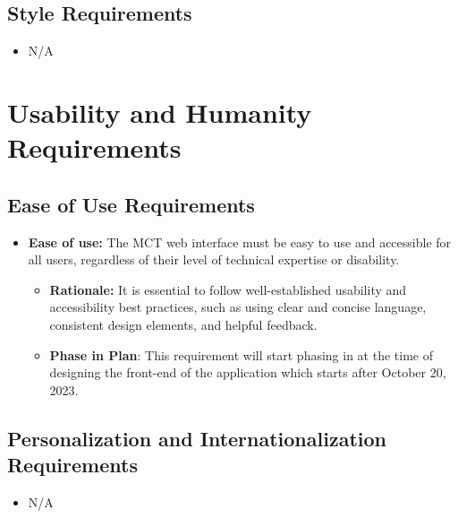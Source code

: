 \documentclass[12pt]{article}
\begin{document}
\subsection{Style Requirements}
\begin{itemize}
    \item N/A
\end{itemize}

\section{Usability and Humanity Requirements}
\subsection{Ease of Use Requirements}

\begin{itemize}
    \item \textbf{Ease of use:} The MCT web interface must be easy to use and accessible for all users, regardless of their level of technical expertise or disability.
    \begin{itemize}
        \item 
\textbf{Rationale: }It is essential to follow well-established usability and accessibility best practices, such as using clear and concise language, consistent design elements, and helpful feedback. 
\item \textbf{Phase in Plan}: This requirement will start phasing in at the time of designing the front-end of the application which starts after October 20, 2023.


    \end{itemize}
\end{itemize}


\subsection{Personalization and Internationalization Requirements}
\begin{itemize}
    \item N/A
\end{itemize}
\end{document}
